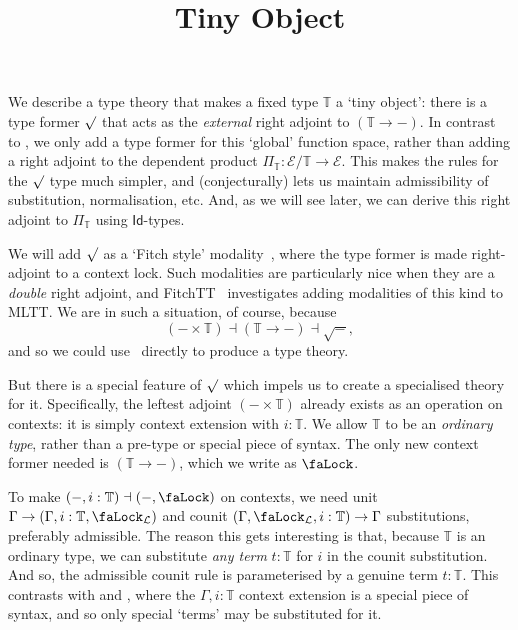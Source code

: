 \documentclass[10pt]{article}
\title{Tiny Object}
\author{}
\date{}
\theoremstyle{definition}
\newcommand{\Idsym}{\mathsf{Id}}
\newcommand{\lock}{\text{\faLock}}
\newcommand{\Tiny}{\mathbb{T}}
\newcommand{\lockn}[1]{\mathcal{#1}}
\newcommand{\ctxlock}[1]{\lock_{\lockn{#1}}}
\newcommand{\rformu}[1]{\surd #1}
\begin{document}
\maketitle

We describe a type theory that makes a fixed type $\Tiny$ a `tiny object': there is a type former $\rformu$ that acts as the \emph{external} right adjoint to $(\Tiny \to -)$. In contrast to \cite[Section 2]{transpension}, we only add a type former for this `global' function space, rather than adding a right adjoint to the dependent product $\Pi_\Tiny : \mathcal{E}/\Tiny \to \mathcal{E}$. This makes the rules for the $\rformu$ type much simpler, and (conjecturally) lets us maintain admissibility of substitution, normalisation, etc. And, as we will see later, we can derive this right adjoint to $\Pi_\Tiny$ using $\Idsym$-types.

We will add $\rformu$ as a `Fitch style' modality~\cite{clouston:fitch-style}, where the type former is made right-adjoint to a context lock. Such modalities are particularly nice when they are a \emph{double} right adjoint, and FitchTT~\cite{fitchtt} investigates adding modalities of this kind to MLTT. We are in such a situation, of course, because \[{(- \times \Tiny) \dashv (\Tiny \to -) \dashv \rformu -},\] and so we could use~\cite{fitchtt} directly to produce a type theory. 

But there is a special feature of $\rformu$ which impels us to create a specialised theory for it. Specifically, the leftest adjoint $(- \times \Tiny)$ already exists as an operation on contexts: it is simply context extension with $i : \Tiny$. We allow $\Tiny$ to be an \emph{ordinary type}, rather than a pre-type or special piece of syntax. The only new context former needed is $(\Tiny \to -)$, which we write as $\lock$. 

To make $(-,i:\Tiny) \dashv (-,\lock)$ on contexts, we need unit $\Gamma \to (\Gamma,i : \Tiny, \ctxlock{L})$ and counit $(\Gamma,\ctxlock{L},i : \Tiny) \to \Gamma$ substitutions, preferably admissible. The reason this gets interesting is that, because $\Tiny$ is an ordinary type, we can substitute \emph{any term} $t : \Tiny$ for $i$ in the counit substitution. And so, the admissible counit rule is parameterised by a genuine term $t : \Tiny$. This contrasts with \cite{cavallo-harper:parametricity-for-ctt,cavallo:thesis} and \cite[Section 5]{fitchtt}, where the $\Gamma,i:\Tiny$ context extension is a special piece of syntax, and so only special `terms' may be substituted for it.
\end{document}
